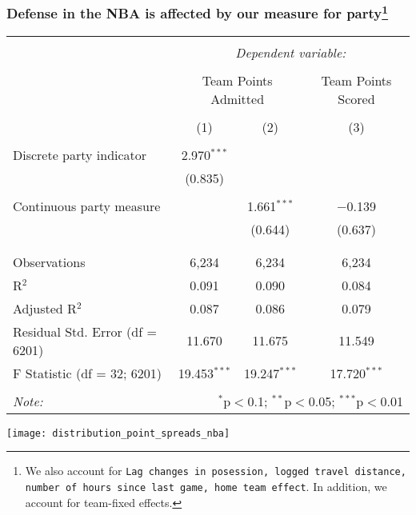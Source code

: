 \documentclass{beamer}
\begin{document}
\begin{frame}   \frametitle{Defense in the NBA is affected by our measure for party\footnote{\tiny{We also account for \texttt{Lag changes in posession, logged travel distance, number of hours since last game, home team effect}. In addition, we account for team-fixed effects.}}}
\scriptsize{
\begin{tabular}{@{\extracolsep{5pt}}lccc}  \\[-1.8ex]\hline  \hline \\[-1.8ex]   & \multicolumn{3}{c}{\textit{Dependent variable:}} \\  \cline{2-4}  \\[-1.8ex] & \multicolumn{2}{c}{Team Points Admitted} & Team Points Scored \\  \\[-1.8ex] & (1) & (2) & (3)\\  \hline \\[-1.8ex]   Discrete party indicator & 2.970$^{***}$ &  &  \\    & (0.835) &  &  \\    & & & \\   Continuous party measure &  & 1.661$^{***}$ & $-$0.139 \\    &  & (0.644) & (0.637) \\    & & & \\  \hline \\[-1.8ex]  Observations & 6,234 & 6,234 & 6,234 \\  R$^{2}$ & 0.091 & 0.090 & 0.084 \\  Adjusted R$^{2}$ & 0.087 & 0.086 & 0.079 \\  Residual Std. Error (df = 6201) & 11.670 & 11.675 & 11.549 \\  F Statistic (df = 32; 6201) & 19.453$^{***}$ & 19.247$^{***}$ & 17.720$^{***}$ \\  \hline  \hline \\[-1.8ex]  \textit{Note:}  & \multicolumn{3}{r}{$^{*}$p$<$0.1; $^{**}$p$<$0.05; $^{***}$p$<$0.01} \\  \end{tabular} 
} \end{frame}


\begin{frame}
  \centering
  \texttt{[image: distribution\_point\_spreads\_nba]}
\end{frame}
\end{document}
